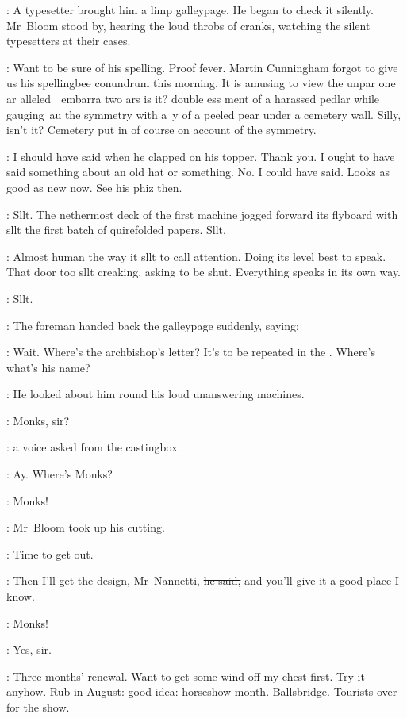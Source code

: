 :
A typesetter brought him a limp galleypage.
He began to check it silently.
Mr~Bloom stood by,
hearing the loud throbs of cranks,
watching the silent typesetters at their cases.



\BloomInt:
Want to be sure of his spelling.
Proof fever.
Martin Cunningham forgot to give us his spellingbee conundrum this morning.
It is amusing to view the
unpar one ar alleled |
embarra two ars is it?
double ess ment of a harassed pedlar
while gauging~au
the symmetry with a~y
of a peeled pear
under a cemetery wall.
Silly, isn't it?
Cemetery put in of course
on account of the symmetry.

\BloomInt:
I should have said when he clapped on his topper.
Thank you.
I ought to have said something about an old hat or something.
No.
I could have said.
Looks as good as new now.
See his phiz then.

:
Sllt.
The nethermost deck of the first machine
jogged forward its flyboard
with sllt
the first batch of quirefolded papers.
Sllt.

\BloomInt:
Almost human the way it sllt to call attention.
Doing its level best to speak.
That door too sllt creaking, asking to be shut.
Everything speaks in its own way.

:
Sllt.




:
The foreman handed back the galleypage suddenly,
saying:

\foreman:
Wait.
Where's the archbishop's letter?
It's to be repeated in the .
Where's what's his name?

:
He looked about him round his loud unanswering machines.

\voice:
Monks, sir?

:
a voice asked from the castingbox.

\foreman:
Ay.
Where's Monks?

\foreman:
Monks!

:
Mr~Bloom took up his cutting.

\BloomInt:
Time to get out.

\Bloom:
Then I'll get the design, Mr~Nannetti,
\sout{he said,}
and you'll give it a good place I know.

\foreman:
Monks!

\voice:
Yes, sir.

\BloomInt:
Three months' renewal.
Want to get some wind off my chest first.
Try it anyhow.
Rub in August:
good idea: horseshow month.
Ballsbridge.
Tourists over for the show.


